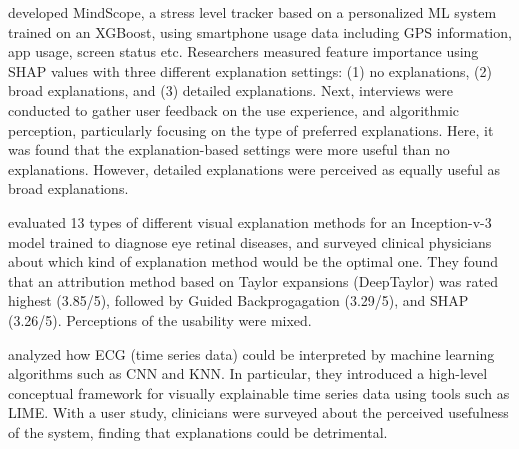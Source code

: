 \cite{kim2022prediction} developed MindScope, a stress level tracker based on a personalized ML system trained on an XGBoost, using smartphone usage data including GPS information, app usage, screen status etc. Researchers measured feature importance using SHAP values with three different explanation settings: (1) no explanations, (2) broad explanations, and (3) detailed explanations. Next, interviews were conducted to gather user feedback on the use experience, and algorithmic perception, particularly focusing on the type of preferred explanations. Here, it was found that the explanation-based settings were more useful than no explanations. However, detailed explanations were perceived as equally useful as broad explanations. 

\cite{singh2021evaluation} evaluated 13 types of different visual explanation methods for an Inception-v-3 model trained to diagnose eye retinal diseases, and surveyed clinical physicians about which kind of explanation method would be the optimal one. They found that an attribution method based on Taylor expansions (DeepTaylor) was rated highest (3.85/5), followed by Guided Backprogagation (3.29/5), and SHAP (3.26/5). Perceptions of the usability were mixed.  

\cite{neves2021interpretable} analyzed how ECG (time series data) could be interpreted by machine learning algorithms such as CNN and KNN. In particular, they introduced a high-level conceptual framework for visually explainable time series data using tools such as LIME. With a user study, clinicians were surveyed about the perceived usefulness of the system, finding that explanations could be detrimental. 



